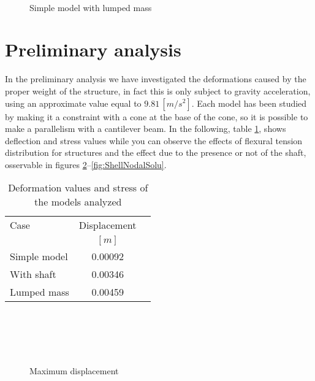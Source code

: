 \begin{figure}[ht]
\centering
{} \quad
{}\\
\caption{Simple model with lumped mass}
\label{fig:AnsysMeshLumped}
\end{figure}

\newpage

\section{Preliminary analysis}
In the preliminary analysis we have investigated the deformations caused by the proper weight of the structure, in fact this is only subject to gravity acceleration, using an approximate value equal to $9.81\,[m/s^2]$.
Each model has been studied by making it a constraint with a cone at the base of the cone, so it is possible to make a parallelism with a cantilever beam.
In the following, table \ref{tab:RecapStressDeformation}, shows deflection and stress values while you can observe the effects of flexural tension distribution for structures and the effect due to the presence or not of the shaft, osservable in figures \ref{fig:ShellDisplacement}--\ref{fig:ShellNodalSolu}.

\begin{table}[!ht]
\centering
\begin{tabular}{lcc}
	\hline
	Case				& Displacement 	\\
					& $[m]$			\\
	\hline
	Simple model		& 0.00092 		\\
	With shaft		& 0.00346 		\\
	Lumped mass		& 0.00459 		\\
	\hline
\end{tabular}
\caption{Deformation values and stress of the models analyzed}
\label{tab:RecapStressDeformation}
\end{table}

\begin{figure}[ht]
\centering
{} \,
\end{figure}
\begin{figure}[ht]\ContinuedFloat
\centering
{} \\
   \\
\caption{Maximum displacement}
\label{fig:ShellDisplacement}
\end{figure}


